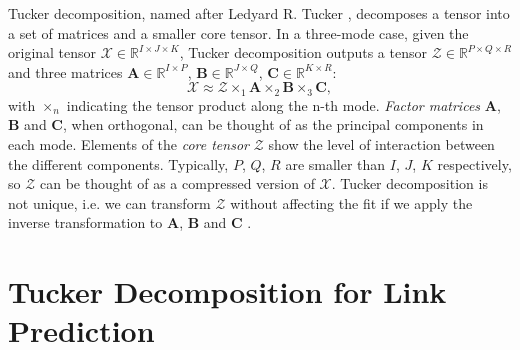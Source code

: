 \documentclass[11pt,a4paper]{article}
\begin{document}
Tucker decomposition, named after Ledyard R. Tucker \cite{tucker1964extension}, decomposes a tensor into a set of matrices and a smaller core tensor. In a three-mode case, given the original tensor $\mathcal{X} \in \mathbb{R}^{I \times J\times K}$, Tucker decomposition outputs a tensor $\mathcal{Z} \in \mathbb{R}^{P \times Q\times R}$ and three matrices $\mathbf{A} \in \mathbb{R}^{I \times P}$, $\mathbf{B} \in \mathbb{R}^{J \times Q}$, $\mathbf{C} \in \mathbb{R}^{K \times R}$:
\begin{equation}
\mathcal{X} \approx \mathcal{Z} \times_1 \mathbf{A} \times_2 \mathbf{B} \times_3 \mathbf{C},
\label{eq_tucker}
\end{equation}
with $\times_n$ indicating the tensor product along the n-th mode. \textit{Factor matrices} $\mathbf{A}$, $\mathbf{B}$ and $\mathbf{C}$, when orthogonal, can be thought of as the principal components in each mode. Elements of the \textit{core tensor} $\mathcal{Z}$ show the level of interaction between the different components. Typically, $P$, $Q$, $R$ are smaller than $I$, $J$, $K$ respectively, so $\mathcal{Z}$ can be thought of as a compressed version of $\mathcal{X}$. 
Tucker decomposition is not unique, i.e. we can transform $\mathcal{Z}$ without affecting the fit if we apply the inverse transformation to $\mathbf{A}$, $\mathbf{B}$ and $\mathbf{C}$ \cite{kolda2009tensor}. 
 
 \section{Tucker Decomposition for Link Prediction} \label{sec:tucker}
\end{document}

